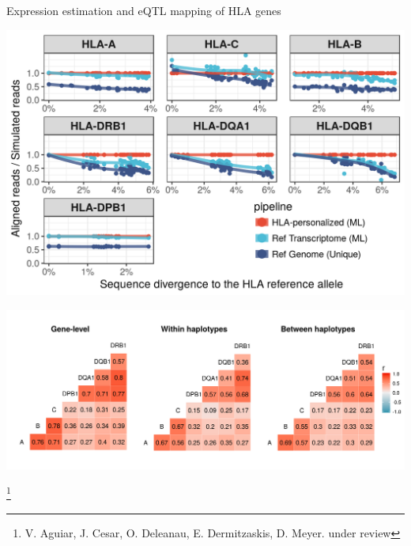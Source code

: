 \documentclass[10pt]{beamer}
\begin{document}
\begin{frame}{Expression estimation and eQTL mapping of HLA genes}
  \begin{minipage}{0.5\textwidth}
  \includegraphics[width=\textwidth]{./Figures/prop_mapped_divergence.png}
  \end{minipage}
  \begin{minipage}{0.45\textwidth}
  \includegraphics[width=\textwidth]{./Figures/correlations.png}
  \end{minipage}
\let\thefootnote\relax\footnote{V. Aguiar, J. Cesar, O. Deleanau, E.
  Dermitzaskis, D. Meyer. under review}
\end{frame}
\end{document}
